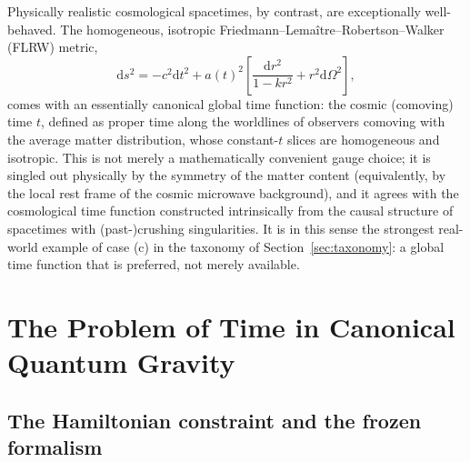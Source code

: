 \documentclass[11pt]{article}
\newcommand{\dd}{\mathrm{d}}
\begin{document}
Physically realistic cosmological spacetimes, by contrast, are exceptionally well-behaved. The homogeneous, isotropic Friedmann--Lema\^itre--Robertson--Walker (FLRW) metric,
\begin{equation}
\dd s^2 = -c^2\dd t^2 + a(t)^2\left[\frac{\dd r^2}{1-kr^2}+r^2\dd\Omega^2\right],
\end{equation}
comes with an essentially canonical global time function: the cosmic (comoving) time $t$, defined as proper time along the worldlines of observers comoving with the average matter distribution, whose constant-$t$ slices are homogeneous and isotropic. This is not merely a mathematically convenient gauge choice; it is singled out physically by the symmetry of the matter content (equivalently, by the local rest frame of the cosmic microwave background), and it agrees with the cosmological time function constructed intrinsically from the causal structure of spacetimes with (past-)crushing singularities. It is in this sense the strongest real-world example of case (c) in the taxonomy of Section~\ref{sec:taxonomy}: a global time function that is preferred, not merely available.

\section{The Problem of Time in Canonical Quantum Gravity}
\label{sec:pot}

\subsection{The Hamiltonian constraint and the frozen formalism}
\end{document}
